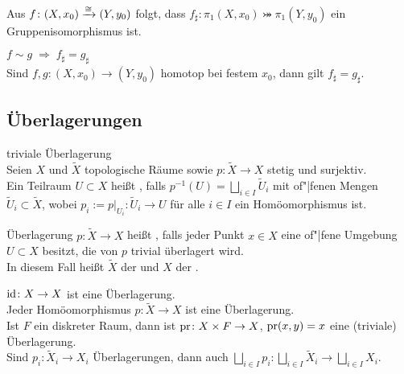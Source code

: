 \begin{Kor}\\
    Aus $f\colon (X, x_0) \xrightarrow{\cong} (Y, y_0)$ folgt, dass
    $f_\sharp\colon \pi_1(X, x_0) \bij \pi_1(Y, y_0)$ ein
    Gruppenisomorphismus ist.
\end{Kor}

\begin{Satz}{$f \sim g \;\Rightarrow\; f_\sharp = g_\sharp$}\\
    Sind $f, g\colon (X, x_0) \rightarrow (Y, y_0)$ homotop bei festem $x_0$,
    dann gilt $f_\sharp = g_\sharp$.
\end{Satz}

\subsection{%
    Überlagerungen%
}

\begin{Def}{triviale Überlagerung}\\
    Seien $X$ und $\widetilde{X}$ topologische Räume sowie
    $p\colon \widetilde{X} \rightarrow X$ stetig und surjektiv. \\
    Ein Teilraum $U \subset X$ heißt ,
    falls $p^{-1}(U) = \bigsqcup_{i \in I} \widetilde{U}_i$
    mit of"|fenen Mengen $\widetilde{U}_i \subset \widetilde{X}$, wobei
    $p_i := p|_{U_i}\colon \widetilde{U}_i \rightarrow U$ für alle $i \in I$
    ein Homöomorphismus ist.
\end{Def}

\begin{Def}{Überlagerung}
    $p\colon \widetilde{X} \rightarrow X$ heißt , falls
    jeder Punkt $x \in X$ eine of"|fene Umgebung $U \subset X$ besitzt,
    die von $p$ trivial überlagert wird. \\
    In diesem Fall heißt $\widetilde{X}$ der  und
    $X$ der .
\end{Def}

\begin{Bsp}
    $\operatorname{id}\colon X \rightarrow X$ ist eine Überlagerung. \\
    Jeder Homöomorphismus $p\colon \widetilde{X} \rightarrow X$
    ist eine Überlagerung. \\
    Ist $F$ ein diskreter Raum, dann ist $\operatorname{pr}\colon X \times F \rightarrow X$,
    $\operatorname{pr}(x, y) = x$ eine (triviale) Überlagerung. \\
    Sind $p_i\colon \widetilde{X}_i \rightarrow X_i$ Überlagerungen, dann auch
    $\bigsqcup_{i \in I} p_i\colon \bigsqcup_{i \in I} \widetilde{X}_i
    \rightarrow \bigsqcup_{i \in I} X_i$.
\end{Bsp}


